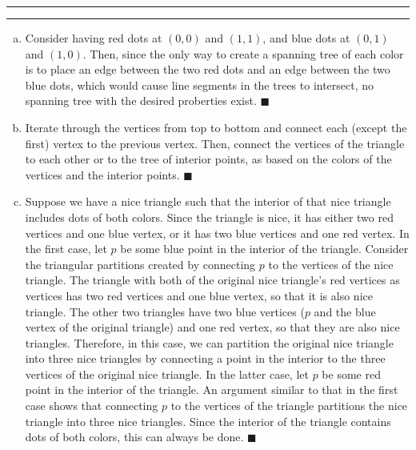 \documentclass[11pt]{article}
\newcounter{questionCounter}
\newcounter{partCounter}[questionCounter]
\newenvironment{question}[2][\arabic{questionCounter}]{%
    \setcounter{partCounter}{0}%
    \vspace{.25in} \hrule \vspace{0.5em}%
        \noindent{\bf #2}%
    \vspace{0.8em} \hrule \vspace{.10in}%
    \addtocounter{questionCounter}{1}%
}{}
\begin{document}
\begin{question}{Connecting Dots, aka. Geometric Quick Sort}
\begin{enumerate}[(a)]
\item Consider having red dots at $(0,0)$ and $(1,1)$, and blue dots at
$(0,1)$ and $(1,0)$. Then, since the only way to create a spanning tree of
each color is to place an edge between the two red dots and an edge between
the two blue dots, which would cause line segments in the trees to intersect,
no spanning tree with the desired proberties exist. \qquad $\blacksquare$

\item Iterate through the vertices from top to bottom and connect each (except
the first) vertex to the previous vertex. Then, connect the vertices of the
triangle to each other or to the tree of interior points, as based on the
colors of the vertices and the interior points. \qquad $\blacksquare$

\item Suppose we have a nice triangle such that the interior of that nice
triangle includes dots of both colors. Since the triangle is nice, it has
either two red vertices and one blue vertex, or it has two blue vertices and
one red vertex. In the first case, let $p$ be some blue point in the interior
of the triangle. Consider the triangular partitions created by connecting $p$
to the vertices of the nice triangle. The triangle with both of the original
nice triangle's red vertices as vertices has two red vertices and one blue
vertex, so that it is also nice triangle. The other two triangles have two
blue vertices ($p$ and the blue vertex of the original triangle) and one red
vertex, so that they are also nice triangles. Therefore, in this case, we can
partition the original nice triangle into three nice triangles by connecting a
point in the interior to the three vertices of the original nice triangle. In
the latter case, let $p$ be some red point in the interior of the triangle. An
argument similar to that in the first case shows that connecting $p$ to the
vertices of the triangle partitions the nice triangle into three nice
triangles. Since the interior of the triangle contains dots of both colors,
this can always be done. \qquad $\blacksquare$


\end{enumerate}
\end{question}
\end{document}
